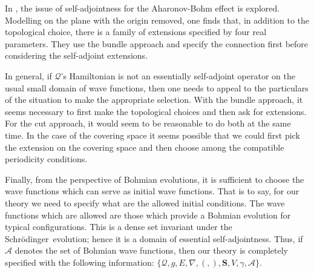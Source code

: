 \documentclass[11pt]{article}
\theoremstyle{remark}
\begin{document}
In \cite{AT98, S97},  the issue of self-adjointness for the
Aharonov-Bohm effect is explored. 
Modelling on the plane with the origin removed,
one finds that, in addition to the topological choice, there is a
family of extensions specified by four real parameters. They use the
bundle approach and specify the connection first before
considering the self-adjoint extensions.


In general, if \ensuremath{\mathcal{Q}}'s Hamiltonian  is not an essentially self-adjoint
operator on the usual small domain of wave functions, then one needs to appeal
to the particulars of the situation to make the appropriate
selection. With the bundle approach, it seems
necessary to first make the topological choices and then ask for
extensions. For the cut approach, it would seem to be reasonable to do
both at the same time. In the case of the covering space 
it seems  possible
that we could first pick the extension on the covering space 
 and then choose among the compatible periodicity
conditions. 

Finally, from the perspective of Bohmian evolutions, it is sufficient
to choose the wave functions which can serve as initial wave functions. That is to say,
for our theory we need to specify what are the allowed initial
conditions. The wave functions which are allowed are those which provide a
Bohmian evolution for typical configurations. This is a dense set
invariant under the Schr\"odinger\ evolution; hence it is a domain of essential
self-adjointness. Thus, if $\ensuremath{\mathcal{A}}$ denotes the set of Bohmian wave functions,
then our theory is completely specified with the following
information:
$\{\ensuremath{\mathcal{Q}}, g, E, \nabla, \ensuremath{({}, {})}, \boldsymbol S, V, \gamma,
\ensuremath{\mathcal{A}}\}$.

\clearpage


\end{document}
